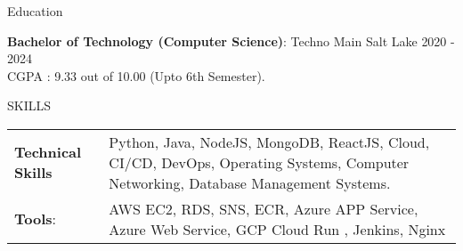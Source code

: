 \documentclass{resume} %
\begin{document}
\begin{rSection}{Education}

{\bf Bachelor of Technology (Computer Science)}: Techno Main Salt Lake \hfill {2020 - 2024}\\
CGPA : 9.33 out of 10.00 (Upto 6th Semester). 



\end{rSection}


\begin{rSection}{SKILLS}
\begin{tabularx}{\linewidth}{@{}l X@{}}
\textbf{Technical Skills} &  \normalsize{Python, Java, NodeJS, MongoDB, ReactJS, Cloud, CI/CD, DevOps, Operating Systems, Computer Networking, Database Management Systems.}\\
\textbf{Tools}: &  \normalsize{AWS EC2, RDS, SNS, ECR, Azure APP Service, Azure Web Service, GCP Cloud Run , Jenkins, Nginx }
\end{tabularx}
\end{rSection}

\end{document}
